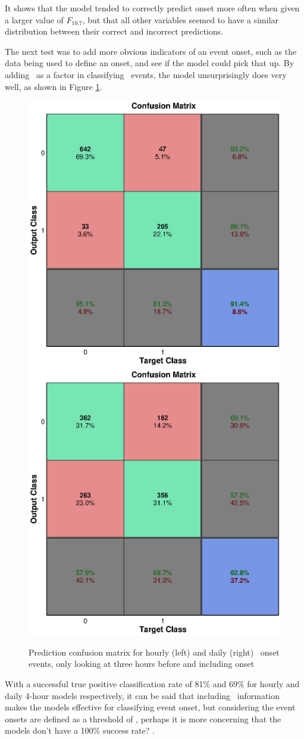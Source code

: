It shows that the model tended to correctly predict onset more often when given a larger value of $F_{10.7}$, but that all other variables seemed to have a similar distribution between their correct and incorrect predictions. 

The next test was to add more obvious indicators of an event onset, such as the data being used to define an onset, and see if the model could pick that up. By adding \req\ as a factor in classifying \req\ events, the model unsurprisingly does very well, as shown in Figure \ref{fig:OnsetWithreq}.

\begin{figure}[htp!]
	\centering
	\includegraphics[width=0.45\linewidth]{Figures/CH5/NNBinaryOnset-hourly-withreq.eps}
	\includegraphics[width=0.45\linewidth]{Figures/CH5/NNBinaryOnset-daily-withreq.eps}
	\caption{Prediction confusion matrix for hourly (left) and daily (right) \req\ onset events, only looking at three hours before and including onset}
	\label{fig:OnsetWithreq}
\end{figure}

With a successful true positive classification rate of 81\% and 69\% for hourly and daily 4-hour models respectively, it can be said that including \req\ information makes the models effective for classifying event onset, but considering the event onsets are defined as a threshold of \req, perhaps it is more concerning that the models don't have a 100\% success rate? .


